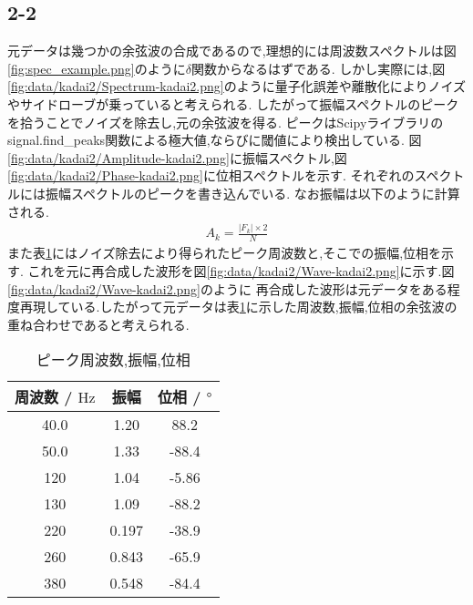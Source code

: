 \subsection*{2-2}
元データは幾つかの余弦波の合成であるので,理想的には周波数スペクトルは図\ref{fig:spec_example.png}のように$\delta$関数からなるはずである.
しかし実際には,図\ref{fig:data/kadai2/Spectrum-kadai2.png}のように量子化誤差や離散化によりノイズやサイドローブが乗っていると考えられる.
したがって振幅スペクトルのピークを拾うことでノイズを除去し,元の余弦波を得る.
ピークはScipyライブラリのsignal.find\_peaks関数による極大値,ならびに閾値により検出している.
図\ref{fig:data/kadai2/Amplitude-kadai2.png}に振幅スペクトル,図\ref{fig:data/kadai2/Phase-kadai2.png}に位相スペクトルを示す.
それぞれのスペクトルには振幅スペクトルのピークを書き込んでいる.
なお振幅は以下のように計算される.
\begin{align*}
  A_k=\frac{|F_k|\times 2}{N}
\end{align*}
また表\ref{tab:2-2}にはノイズ除去により得られたピーク周波数と,そこでの振幅,位相を示す.
これを元に再合成した波形を図\ref{fig:data/kadai2/Wave-kadai2.png}に示す.図\ref{fig:data/kadai2/Wave-kadai2.png}のように
再合成した波形は元データをある程度再現している.したがって元データは表\ref{tab:2-2}に示した周波数,振幅,位相の余弦波の重ね合わせであると考えられる.
\begin{table}[h]
  \caption{ピーク周波数,振幅,位相}
  \label{tab:2-2}
  \centering
  \begin{tabular}{ccc}
    \hline
    周波数 / $\si{\hertz}$ & 振幅  & 位相 / $\si{\degree}$ \\
    \hline \hline
    40.0                   & 1.20  & 88.2                  \\
    50.0                   & 1.33  & -88.4                 \\
    120                    & 1.04  & -5.86                 \\
    130                    & 1.09  & -88.2                 \\
    220                    & 0.197 & -38.9                 \\
    260                    & 0.843 & -65.9                 \\
    380                    & 0.548 & -84.4                 \\
    \hline
  \end{tabular}
\end{table}
